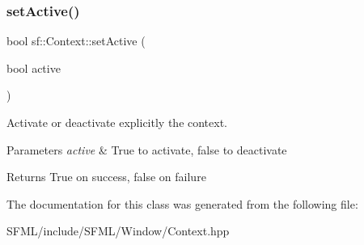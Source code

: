 \subsubsection{\texorpdfstring{setActive()}{setActive()}}
{\footnotesize\ttfamily bool sf\+::\+Context\+::set\+Active (\begin{DoxyParamCaption}\item[{bool}]{active }\end{DoxyParamCaption})}



Activate or deactivate explicitly the context. 


\begin{DoxyParams}{Parameters}
{\em active} & True to activate, false to deactivate\\
\hline
\end{DoxyParams}
\begin{DoxyReturn}{Returns}
True on success, false on failure \begin{DoxyVerb}\end{DoxyVerb}
 
\end{DoxyReturn}


The documentation for this class was generated from the following file\+:\begin{DoxyCompactItemize}
\item 
S\+F\+M\+L/include/\+S\+F\+M\+L/\+Window/Context.\+hpp\end{DoxyCompactItemize}
